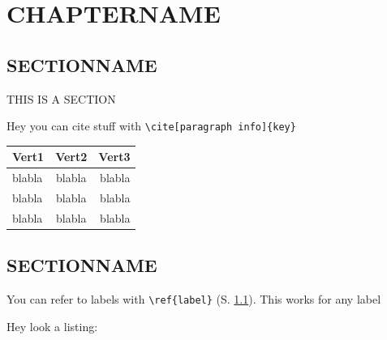\documentclass{../Main/main.tex}{subfiles}
\begin{document}
\chapter{CHAPTERNAME}\label{CHAPTERLABEL}

\section{SECTIONNAME}\label{SECTIONLABEL}

THIS IS A SECTION

Hey you can cite stuff with \verb!\cite[paragraph info]{key}!\cite[blabla]{mycitation}

\begin{figure}[H]
\centering
{}
\label{FIGURELABEL}
\end{figure}

\begin{table}[H]
\centering
    \begin{tabular}{|l|c|r|}
        \hline
        \textbf{Vert1}&\textbf{Vert2} & \textbf{Vert3}\Tstrut\Bstrut\\
        \hline
        blabla & blabla & blabla\Tstrut\\
        blabla & blabla & blabla\\
        blabla & blabla & blabla\Bstrut\\
        \hline
    \end{tabular}
\label{TABLELABEL}
\end{table}

\section{SECTIONNAME}

You can refer to labels with \verb!\ref{label}! (S. \ref{SECTIONLABEL}).
This works for any label

Hey look a listing:
\end{document}
